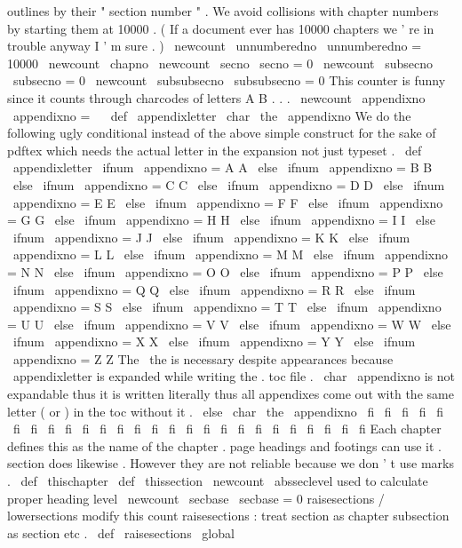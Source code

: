 {{%
outlines
by
their
"
section
number
"
.
We
avoid
collisions
with
chapter
%
numbers
by
starting
them
at
10000
.
(
If
a
document
ever
has
10000
%
chapters
we
'
re
in
trouble
anyway
I
'
m
sure
.
)
\
newcount
\
unnumberedno
\
unnumberedno
=
10000
\
newcount
\
chapno
\
newcount
\
secno
\
secno
=
0
\
newcount
\
subsecno
\
subsecno
=
0
\
newcount
\
subsubsecno
\
subsubsecno
=
0
%
This
counter
is
funny
since
it
counts
through
charcodes
of
letters
A
B
.
.
.
\
newcount
\
appendixno
\
appendixno
=
\
%
%
\
def
\
appendixletter
{
\
char
\
the
\
appendixno
}
%
We
do
the
following
ugly
conditional
instead
of
the
above
simple
%
construct
for
the
sake
of
pdftex
which
needs
the
actual
%
letter
in
the
expansion
not
just
typeset
.
%
\
def
\
appendixletter
{
%
\
ifnum
\
appendixno
=
A
A
%
\
else
\
ifnum
\
appendixno
=
B
B
%
\
else
\
ifnum
\
appendixno
=
C
C
%
\
else
\
ifnum
\
appendixno
=
D
D
%
\
else
\
ifnum
\
appendixno
=
E
E
%
\
else
\
ifnum
\
appendixno
=
F
F
%
\
else
\
ifnum
\
appendixno
=
G
G
%
\
else
\
ifnum
\
appendixno
=
H
H
%
\
else
\
ifnum
\
appendixno
=
I
I
%
\
else
\
ifnum
\
appendixno
=
J
J
%
\
else
\
ifnum
\
appendixno
=
K
K
%
\
else
\
ifnum
\
appendixno
=
L
L
%
\
else
\
ifnum
\
appendixno
=
M
M
%
\
else
\
ifnum
\
appendixno
=
N
N
%
\
else
\
ifnum
\
appendixno
=
O
O
%
\
else
\
ifnum
\
appendixno
=
P
P
%
\
else
\
ifnum
\
appendixno
=
Q
Q
%
\
else
\
ifnum
\
appendixno
=
R
R
%
\
else
\
ifnum
\
appendixno
=
S
S
%
\
else
\
ifnum
\
appendixno
=
T
T
%
\
else
\
ifnum
\
appendixno
=
U
U
%
\
else
\
ifnum
\
appendixno
=
V
V
%
\
else
\
ifnum
\
appendixno
=
W
W
%
\
else
\
ifnum
\
appendixno
=
X
X
%
\
else
\
ifnum
\
appendixno
=
Y
Y
%
\
else
\
ifnum
\
appendixno
=
Z
Z
%
%
The
\
the
is
necessary
despite
appearances
because
\
appendixletter
is
%
expanded
while
writing
the
.
toc
file
.
\
char
\
appendixno
is
not
%
expandable
thus
it
is
written
literally
thus
all
appendixes
come
out
%
with
the
same
letter
(
or
)
in
the
toc
without
it
.
\
else
\
char
\
the
\
appendixno
\
fi
\
fi
\
fi
\
fi
\
fi
\
fi
\
fi
\
fi
\
fi
\
fi
\
fi
\
fi
\
fi
\
fi
\
fi
\
fi
\
fi
\
fi
\
fi
\
fi
\
fi
\
fi
\
fi
\
fi
\
fi
\
fi
}
%
Each
chapter
defines
this
as
the
name
of
the
chapter
.
%
page
headings
and
footings
can
use
it
.
section
does
likewise
.
%
However
they
are
not
reliable
because
we
don
'
t
use
marks
.
\
def
\
thischapter
{
}
\
def
\
thissection
{
}
\
newcount
\
absseclevel
%
used
to
calculate
proper
heading
level
\
newcount
\
secbase
\
secbase
=
0
%
raisesections
/
lowersections
modify
this
count
%
raisesections
:
treat
section
as
chapter
subsection
as
section
etc
.
\
def
\
raisesections
{
\
global
}}}
